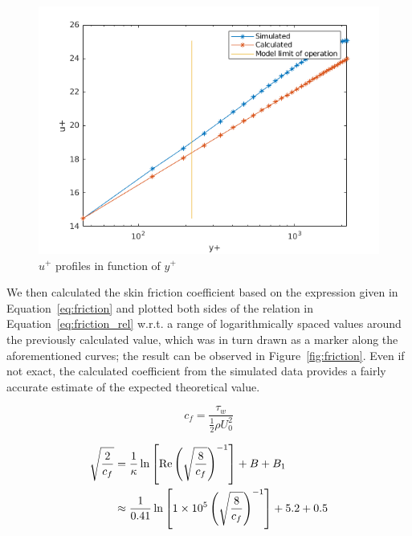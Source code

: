 \documentclass[12pt]{article}
\begin{document}
        \begin{figure}
                \centering
                \includegraphics[width=\textwidth]{Up_Profile.png}
                \caption{\( u^+ \) profiles in function of \( y^+ \)}
                \label{fig:u_plus}
        \end{figure}

        We then calculated the skin friction coefficient based on the expression given in Equation~\ref{eq:friction} and plotted both sides of the relation in Equation~\ref{eq:friction_rel} w.r.t. a range of logarithmically spaced values around the previously calculated value, which was in turn drawn as a marker along the aforementioned curves; the result can be observed in Figure~\ref{fig:friction}. Even if not exact, the calculated coefficient from the simulated data provides a fairly accurate estimate of the expected theoretical value.

        \begin{equation} \label{eq:friction}
                c_f = \frac{\tau_w}{\frac{1}{2} \rho U_0^2}
        \end{equation}

        \begin{equation} \label{eq:friction_rel}
                \begin{split}
                        \sqrt{\frac{2}{c_f}} & = \frac{1}{\kappa} \ln \left[ \text{Re} \left( \sqrt{\frac{8}{c_f}} \right)^{-1} \right] + B + B_1 \\
                        & \approx \frac{1}{0.41} \ln \left[ \num{1E5} \left( \sqrt{\frac{8}{c_f}} \right)^{-1} \right] + 5.2 + 0.5
                \end{split}
        \end{equation}
\end{document}
